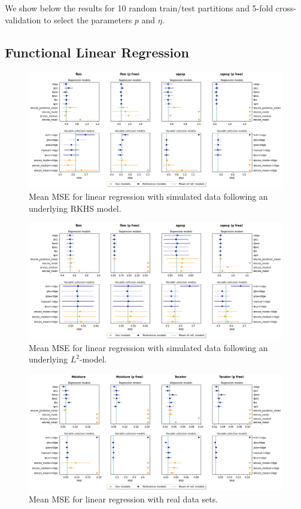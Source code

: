 \documentclass[ba]{imsart}
\numberwithin{equation}{section}
\theoremstyle{plain}
\begin{document}
We show below the results for 10 random train/test partitions and 5-fold cross-validation to select the parameters \(p\) and \(\eta\).

\subsection{Functional Linear Regression}

\begin{figure}[ht!]
  \centering
  \includegraphics[width=\textwidth]{img/reg_emcee_rkhs}
  \caption{Mean MSE for linear regression with simulated data following an underlying RKHS model.}\label{fig:reg-emcee-rkhs}
\end{figure}

\begin{figure}[ht!]
  \centering
  \includegraphics[width=\textwidth]{img/reg_emcee_l2}
  \caption{Mean MSE for linear regression with simulated data following an underlying \(L^2\)-model.}\label{fig:reg-emcee-l2}
\end{figure}

\newpage

\begin{figure}[ht!]
  \centering
  \includegraphics[width=\textwidth]{img/reg_emcee_real}
  \caption{Mean MSE for linear regression with real data sets.}\label{fig:reg-emcee-real}
\end{figure}
\end{document}
